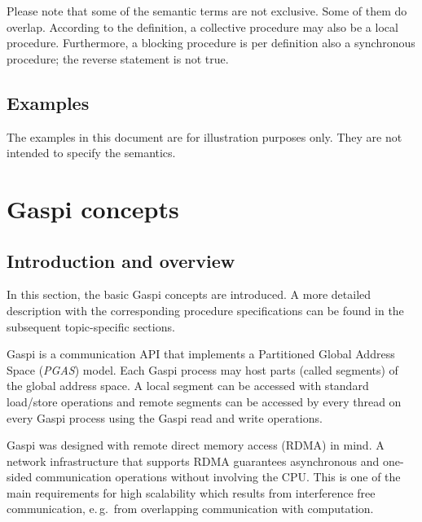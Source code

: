 \documentclass[a4paper]{article}
\newlength{\st}\setlength{\st}{0pt}
\newcommand{\GASPI}{{\sc Gaspi}}
\begin{document}
Please note that some of the semantic terms are not exclusive. Some of
them do overlap. According to the definition, a collective procedure
may also be a local procedure. Furthermore, a blocking procedure is
per definition also a synchronous procedure; the reverse statement is
not true.



\subsection{Examples}

The examples in this document are for illustration purposes only. They are not intended
to specify the semantics.


\section{\GASPI{} concepts}

\subsection{Introduction and overview}

In this section, the basic \GASPI{} concepts are introduced. A more detailed
description with the corresponding procedure specifications can be found
in the subsequent topic-specific sections.

\GASPI{} is a communication API that implements a Partitioned Global
Address Space (\emph{PGAS}) model. Each \GASPI{} process may host 
parts (called segments) of the global address space. A local segment 
can be accessed with standard load/store operations and remote segments
can be accessed by every thread on every \GASPI{} process using the
\GASPI{} read and write operations.

\GASPI{} was designed with remote direct memory access (RDMA) in mind.
A network infrastructure that supports RDMA guarantees asynchronous and
one-sided communication operations without involving the CPU. This is
one of the main requirements for high scalability which results from
interference free communication, e.\,g.\ from overlapping communication
with computation.
\end{document}
